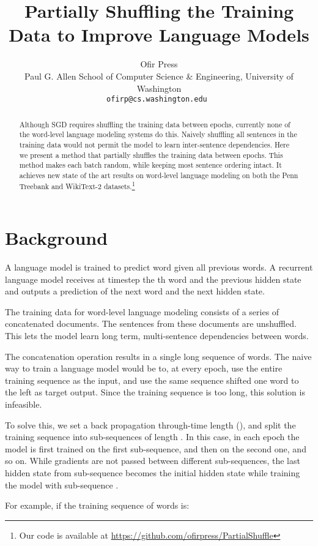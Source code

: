 \documentclass[11pt,a4paper]{article}
\title{Partially Shuffling the Training Data to Improve Language Models}
\author{
	Ofir Press \\
	Paul G. Allen School of Computer Science \& Engineering,
	University of Washington \\
	{\tt ofirp@cs.washington.edu }
}
\date{}
\begin{document}
\maketitle
\begin{abstract}
Although SGD requires shuffling the training data between epochs, currently none of the word-level language modeling systems do this. Naively shuffling all sentences in the training data would not permit the model to learn inter-sentence dependencies. Here we present a method that partially shuffles the training data between epochs. This method makes each batch random, while keeping most sentence ordering intact. It achieves new state of the art results on word-level language modeling on both the Penn Treebank and WikiText-2 datasets.\footnote{Our code is available at {\tiny \url{https://github.com/ofirpress/PartialShuffle}}}
\end{abstract}

\section{Background}
A language model is trained to predict word  given all previous  words. A recurrent language model receives at timestep  the th word and the previous hidden state and outputs a prediction of the next word and the next hidden state. 

The training data for word-level language modeling consists of a series of concatenated documents. The sentences from these documents are unshuffled. This lets the model learn long term, multi-sentence dependencies between words. 

The concatenation operation results in a single long sequence of words. 
The naive way to train a language model would be to, at every epoch, use the entire training sequence as the input, and use the same sequence shifted one word to the left as target output.
Since the training sequence is too long, this solution is infeasible.

To solve this, we set a back propagation through-time length (), and split the training sequence into sub-sequences of length . In this case, in each epoch the model is first trained on the first sub-sequence, and then on the second one, and so on. While gradients are not passed between different sub-sequences, the last hidden state from sub-sequence  becomes the initial hidden state while training the model with sub-sequence . 

For example, if the training sequence of words is:
\end{document}

